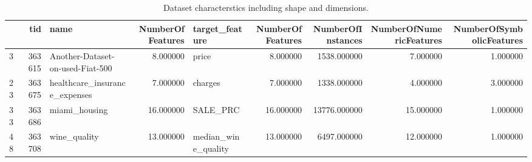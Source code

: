 \begin{table}
\caption{Dataset characterstics including shape and dimensions.}
\begin{tabular}{lrlrlrrrr}
\toprule
 & tid & name & NumberOfFeatures & target_feature & NumberOfFeatures & NumberOfInstances & NumberOfNumericFeatures & NumberOfSymbolicFeatures \\
\midrule
3 & 363615 & Another-Dataset-on-used-Fiat-500 & 8.000000 & price & 8.000000 & 1538.000000 & 7.000000 & 1.000000 \\
23 & 363675 & healthcare_insurance_expenses & 7.000000 & charges & 7.000000 & 1338.000000 & 4.000000 & 3.000000 \\
33 & 363686 & miami_housing & 16.000000 & SALE_PRC & 16.000000 & 13776.000000 & 15.000000 & 1.000000 \\
48 & 363708 & wine_quality & 13.000000 & median_wine_quality & 13.000000 & 6497.000000 & 12.000000 & 1.000000 \\
\bottomrule
\end{tabular}
\end{table}

